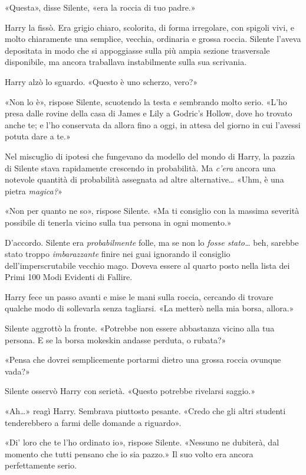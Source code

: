 «Questa», disse Silente, «era la roccia di tuo padre.»

Harry la fissò. Era grigio chiaro, scolorita, di forma irregolare, con spigoli vivi, e molto chiaramente una semplice, vecchia, ordinaria e grossa roccia. Silente l’aveva depositata in modo che si appoggiasse sulla più ampia sezione trasversale disponibile, ma ancora traballava instabilmente sulla sua scrivania.

Harry alzò lo sguardo. «Questo è uno scherzo, vero?»

«Non lo è», rispose Silente, scuotendo la testa e sembrando molto serio. «L’ho presa dalle rovine della casa di James e Lily a Godric’s Hollow, dove ho trovato anche te; e l’ho conservata da allora fino a oggi, in attesa del giorno in cui l’avessi potuta dare a te.»

Nel miscuglio di ipotesi che fungevano da modello del mondo di Harry, la pazzia di Silente stava rapidamente crescendo in probabilità. Ma \textit{c’era} ancora una notevole quantità di probabilità assegnata ad altre alternative… «Uhm, è una pietra \textit{magica?}»

«Non per quanto ne so», rispose Silente. «Ma ti consiglio con la massima severità possibile di tenerla vicino sulla tua persona in ogni momento.»

D’accordo. Silente era \textit{probabilmente} folle, ma se non lo \textit{fosse stato…} beh, sarebbe stato troppo \textit{imbarazzante} finire nei guai ignorando il consiglio dell’imperscrutabile vecchio mago. Doveva essere al quarto posto nella lista dei Primi 100 Modi Evidenti di Fallire.

Harry fece un passo avanti e mise le mani sulla roccia, cercando di trovare qualche modo di sollevarla senza tagliarsi. «La metterò nella mia borsa, allora.»

Silente aggrottò la fronte. «Potrebbe non essere abbastanza vicino alla tua persona. E se la borsa mokeskin andasse perduta, o rubata?»

«Pensa che dovrei semplicemente portarmi dietro una grossa roccia ovunque vada?»

Silente osservò Harry con serietà. «Questo potrebbe rivelarsi saggio.»

«Ah…» reagì Harry. Sembrava piuttosto pesante. «Credo che gli altri studenti tenderebbero a farmi delle domande a riguardo».

«Di’ loro che te l’ho ordinato io», rispose Silente. «Nessuno ne dubiterà, dal momento che tutti pensano che io sia pazzo.» Il suo volto era ancora perfettamente serio.

